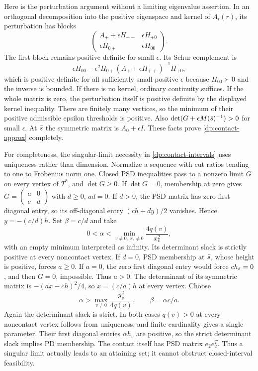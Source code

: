 Here is the perturbation argument without a limiting eigenvalue assertion.
In an orthogonal decomposition into the positive eigenspace and kernel of
$A_i(r)$, its perturbation has blocks
\[
 \begin{pmatrix}A_++\epsilon H_{++}&\epsilon H_{+0}\\
                  \epsilon H_{0+}&\epsilon H_{00}\end{pmatrix}.
\]
The first block remains positive definite for small $\epsilon$.
Its Schur complement is
\[
 \epsilon H_{00}-\epsilon^2H_{0+}
 (A_++\epsilon H_{++})^{-1}H_{+0},
\]
which is positive definite for all sufficiently small positive $\epsilon$
because $H_{00}\succ0$ and the inverse is bounded. If there is no kernel,
ordinary continuity suffices. If the whole matrix is zero, the perturbation
itself is positive definite by the displayed kernel inequality.
There are finitely many vertices, so the minimum of their positive admissible
epsilon thresholds is positive. Also $\det(G+\epsilon M(\bar s)^{-1})>0$
for small $\epsilon$. At $\bar s$ the symmetric matrix is $A_0+\epsilon I$.
These facts prove \cref{dp:contact-approx} completely.

For completeness, the singular-limit necessity in
\cref{dp:contact-intervals} uses uniqueness rather than dimension.
Normalize a sequence with cut ratios tending to one to Frobenius norm one.
Closed PSD inequalities pass to a nonzero limit $G$ on every vertex of
$T^*$, and $\det G\ge0$. If $\det G=0$, membership at zero gives
$G=\left(\begin{smallmatrix}a&0\\c&d\end{smallmatrix}\right)$ with
$d\ge0$, $ad=0$.
If $d>0$, the PSD matrix has zero first diagonal entry, so its
off-diagonal entry $(ch+dy)/2$ vanishes. Hence $y=-(c/d)h$.
Set $\beta=c/d$ and take
\[
 0<\alpha<\min_{v\ne0,\ x_v\ne0}\frac{4q(v)}{x_v^2},
\]
with an empty minimum interpreted as infinity. Its determinant slack is
strictly positive at every noncontact vertex.
If $d=0$, PSD membership at $\bar s$, whose height is positive, forces
$a\ge0$. If $a=0$, the zero first diagonal entry would force
$ch_{\bar s}=0$, and then $G=0$, impossible. Thus $a>0$.
The determinant of its symmetric matrix is
$-(ax-ch)^2/4$, so $x=(c/a)h$ at every vertex. Choose
\[
 \alpha>\max_{v\ne0}\frac{y_v^2}{4q(v)},\qquad\beta=\alpha c/a.
\]
Again the determinant slack is strict. In both cases $q(v)>0$ at every
noncontact vertex follows from uniqueness, and finite cardinality gives a
single parameter. Their first diagonal entries $\alpha h_v$ are positive,
so the strict determinant slack implies PD membership. The contact itself
has PSD matrix $e_2e_2^T$. Thus a singular limit actually leads to an
attaining set; it cannot obstruct closed-interval feasibility.

